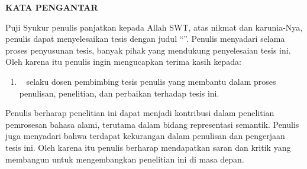 \clearpage

\begin{center}
 \textbf{\large KATA PENGANTAR}\\[3em]
\end{center}

Puji Syukur penulis panjatkan kepada Allah SWT, atas nikmat dan karunia-Nya, penulis dapat menyelesaikan tesis dengan judul ``\textit{\Title}''. Penulis menyadari selama proses penyusunan tesis, banyak pihak yang mendukung penyelesaian tesis ini. Oleh karena itu penulis ingin mengucapkan terima kasih kepada:
\begin{enumerate}
  \item \SupervisorHonorific~\SupervisorName{} selaku dosen pembimbing tesis penulis yang membantu dalam proses penulisan, penelitian, dan perbaikan terhadap tesis ini.
\end{enumerate}

Penulis berharap penelitian ini dapat menjadi kontribusi dalam penelitian pemrosesan bahasa alami, terutama dalam bidang representasi semantik. Penulis juga menyadari bahwa terdapat kekurangan dalam penulisan dan pengerjaan tesis ini. Oleh karena itu penulis berharap mendapatkan saran dan kritik yang membangun untuk mengembangkan penelitian ini di masa depan.
